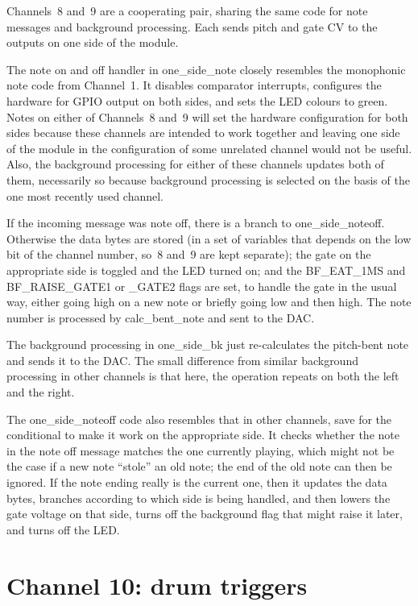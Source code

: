 Channels~8 and~9 are a cooperating pair, sharing the same code for note
messages and background processing.  Each sends pitch and gate CV to the
outputs on one side of the module.

The note on and off handler in one\_side\_note closely resembles the
monophonic note code from Channel~1.  It disables comparator interrupts,
configures the hardware for GPIO output on both sides, and sets the LED
colours to green.  Notes on either of Channels~8 and~9 will set the hardware
configuration for both sides because these channels are intended to work
together and leaving one side of the module in the configuration of some
unrelated channel would not be useful.  Also, the background processing for
either of these channels updates both of them, necessarily so because
background processing is selected on the basis of the one most recently used
channel.

If the incoming message was note off, there is a branch to
one\_side\_noteoff.  Otherwise the data bytes are stored (in a set of
variables that depends on the low bit of the channel number, so~8 and~9 are
kept separate); the gate on the appropriate side is toggled and the LED
turned on; and the BF\_EAT\_1MS and BF\_RAISE\_GATE1 or \_GATE2 flags
are set, to handle the gate in the usual way, either going high on a new
note or briefly going low and then high.  The note number is processed by
calc\_bent\_note and sent to the DAC.

The background processing in one\_side\_bk just re-calculates the pitch-bent
note and sends it to the DAC.  The small difference from similar background
processing in other channels is that here, the operation repeats on both the
left and the right.

The one\_side\_noteoff code also resembles that in other channels, save for
the conditional to make it work on the appropriate side.  It checks whether
the note in the note off message matches the one currently playing, which
might not be the case if a new note ``stole'' an old note; the end of the
old note can then be ignored.  If the note ending really is the current one,
then it updates the data bytes, branches according to which side is being
handled, and then lowers the gate voltage on that side, turns off the
background flag that might raise it later, and turns off the LED.

\section{Channel 10:  drum triggers}

